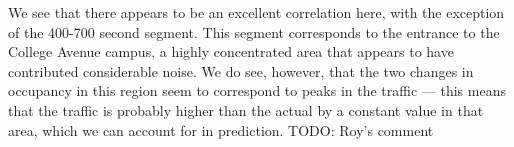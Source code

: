 We see that there appears to be an excellent correlation here, with the exception of the 400-700 second segment. %
This segment corresponds to the entrance to the College Avenue campus, a highly concentrated area that appears to have contributed considerable noise.
We do see, however, that the two changes in occupancy in this region seem to correspond to peaks in the traffic --- this means that the traffic is probably higher than the actual by a constant value in that area, which we can account for in prediction. TODO: Roy's comment
